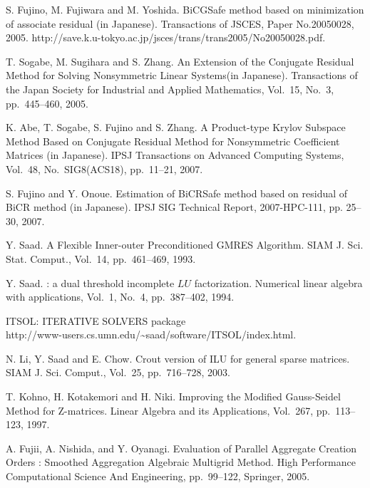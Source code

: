 \documentclass[a4paper]{article}
\begin{document}
\newpage
{}
\begin{thebibliography}{10}
S. Fujino, M. Fujiwara and M. Yoshida.
\newblock BiCGSafe method based on minimization of associate residual (in Japanese).
\newblock Transactions of JSCES, Paper No.20050028, 2005. 
http://save.k.u-tokyo.ac.jp/jsces/trans/trans2005/No20050028.pdf.

T. Sogabe, M. Sugihara and S. Zhang.
\newblock An Extension of the Conjugate Residual Method for Solving Nonsymmetric Linear Systems(in Japanese).
\newblock Transactions of the Japan Society for Industrial and Applied Mathematics, Vol.~15, No.~3, pp.\ 445--460, 2005.

K. Abe, T. Sogabe, S. Fujino and S. Zhang.
\newblock A Product-type Krylov Subspace Method Based on Conjugate Residual Method for Nonsymmetric Coefficient Matrices (in Japanese).
\newblock IPSJ Transactions on Advanced Computing Systems,  Vol.~48, No.~SIG8(ACS18), pp.\ 11--21, 2007.

S. Fujino and Y. Onoue.
\newblock Estimation of BiCRSafe method based on residual of BiCR method (in Japanese).
\newblock IPSJ SIG Technical Report, 2007-HPC-111, pp. 25--30, 2007.

Y. Saad.
\newblock A Flexible Inner-outer Preconditioned GMRES Algorithm.
\newblock SIAM J. Sci. Stat. Comput., Vol.~14, pp.\ 461--469, 1993.

Y. Saad.
: a dual threshold incomplete ${LU}$ factorization.
\newblock Numerical linear algebra with applications, Vol.~1, No.~4, pp.\ 387--402, 1994. 

ITSOL: ITERATIVE SOLVERS package \\
\newblock http://www-users.cs.umn.edu/\textasciitilde saad/software/ITSOL/index.html.

N. Li, Y. Saad and E. Chow.
\newblock Crout version of ILU for general sparse matrices.
\newblock SIAM J. Sci. Comput., Vol.~25, pp.\ 716--728, 2003. 

{T. Kohno}, {H. Kotakemori} and {H. Niki}.
\newblock Improving the Modified Gauss-Seidel Method for Z-matrices.
\newblock Linear Algebra and its Applications, Vol.~267, pp.\ 113--123, 1997.

A. Fujii, A. Nishida, and Y. Oyanagi.
\newblock Evaluation of Parallel Aggregate Creation Orders : Smoothed Aggregation Algebraic Multigrid Method.
\newblock High Performance Computational Science And Engineering, pp.\ 99--122, Springer, 2005. 


\end{thebibliography}
\end{document}
